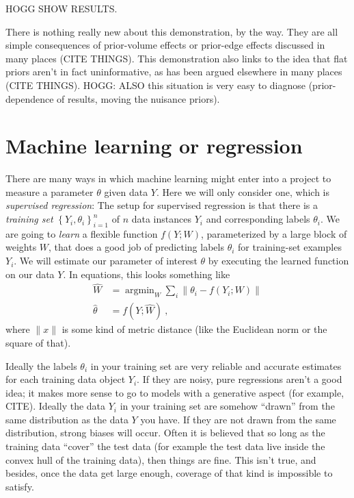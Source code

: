 \documentclass{article}
\newcommand{\setof}[1]{\left\{{#1}\right\}}
\newcommand{\norm}[1]{\lVert{#1}\rVert}
\DeclareMathOperator*{\argmin}{argmin}
\begin{document}
HOGG SHOW RESULTS.

There is nothing really new about this demonstration, by the way.
They are all simple consequences of prior-volume effects or prior-edge effects discussed in many places (CITE THINGS).
This demonstration also links to the idea that flat priors aren't in fact uninformative, as has been argued elsewhere in many places (CITE THINGS).
HOGG: ALSO this situation is very easy to diagnose (prior-dependence of results, moving the nuisance priors).

\section{Machine learning or regression}\label{sec:ml}
There are many ways in which machine learning might enter into a project to measure a parameter $\theta$ given data $Y$.
Here we will only consider one, which is \emph{supervised regression}:
The setup for supervised regression is that there is a \emph{training set} $\setof{Y_i, \theta_i}_{i=1}^n$ of $n$ data instances $Y_i$ and corresponding labels $\theta_i$.
We are going to \emph{learn} a flexible function $f(Y;W)$, parameterized by a large block of weights $W$, that does a good job of predicting labels $\theta_i$ for training-set examples $Y_i$.
We will estimate our parameter of interest $\theta$ by executing the learned function on our data $Y$.
In equations, this looks something like
\begin{align}
    \hat{W} &= \argmin_W \sum_i\norm{\theta_i - f(Y_i;W)} \\
    \hat{\theta} &= f(Y;\hat{W}) ~,
\end{align}
where $\norm{x}$ is some kind of metric distance (like the Euclidean norm or the square of that).

Ideally the labels $\theta_i$ in your training set are very reliable and accurate estimates for each training data object $Y_i$.
If they are noisy, pure regressions aren't a good idea; it makes more sense to go to models with a generative aspect (for example, CITE).
Ideally the data $Y_i$ in your training set are somehow ``drawn'' from the same distribution as the data $Y$ you have.
If they are not drawn from the same distribution, strong biases will occur.
Often it is believed that so long as the training data ``cover'' the test data (for example the test data live inside the convex hull of the training data), then things are fine.
This isn't true, and besides, once the data get large enough, coverage of that kind is impossible to satisfy.
\end{document}
